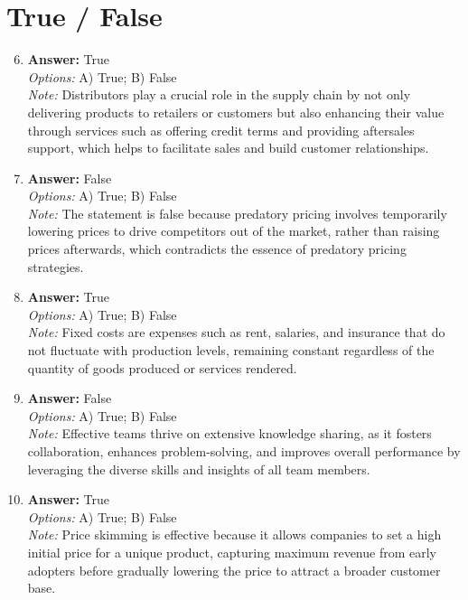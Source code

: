 \documentclass[12pt]{article}
\begin{document}
\section*{True / False}
\begin{enumerate}[label=\arabic*.]
\setcounter{enumi}{5}
\item \textbf{Answer:} True
\\ \textit{Options:} A) True; B) False
\\ \textit{Note:} Distributors play a crucial role in the supply chain by not only delivering products to retailers or customers but also enhancing their value through services such as offering credit terms and providing aftersales support, which helps to facilitate sales and build customer relationships.
\item \textbf{Answer:} False
\\ \textit{Options:} A) True; B) False
\\ \textit{Note:} The statement is false because predatory pricing involves temporarily lowering prices to drive competitors out of the market, rather than raising prices afterwards, which contradicts the essence of predatory pricing strategies.
\item \textbf{Answer:} True
\\ \textit{Options:} A) True; B) False
\\ \textit{Note:} Fixed costs are expenses such as rent, salaries, and insurance that do not fluctuate with production levels, remaining constant regardless of the quantity of goods produced or services rendered.
\item \textbf{Answer:} False
\\ \textit{Options:} A) True; B) False
\\ \textit{Note:} Effective teams thrive on extensive knowledge sharing, as it fosters collaboration, enhances problem-solving, and improves overall performance by leveraging the diverse skills and insights of all team members.
\item \textbf{Answer:} True
\\ \textit{Options:} A) True; B) False
\\ \textit{Note:} Price skimming is effective because it allows companies to set a high initial price for a unique product, capturing maximum revenue from early adopters before gradually lowering the price to attract a broader customer base.
\end{enumerate}
\end{document}
